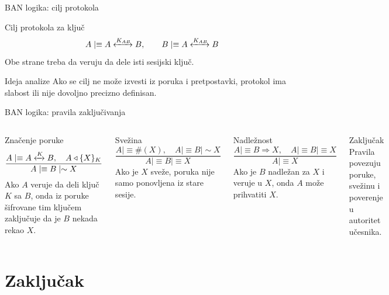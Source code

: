 \documentclass[aspectratio=1610]{beamer}
\newcommand{\enc}[2]{\{#1\}_{#2}}
\begin{document}
\begin{frame}[t]{BAN logika: cilj protokola}
\small
\begin{block}{Cilj protokola za ključ}
\[
A\mid\equiv A\xleftrightarrow{K_{AB}}B,
\qquad
B\mid\equiv A\xleftrightarrow{K_{AB}}B
\]
Obe strane treba da veruju da dele isti sesijski ključ.
\end{block}

\begin{alertblock}{Ideja analize}
Ako se cilj ne može izvesti iz poruka i pretpostavki, protokol ima slabost ili nije dovoljno precizno definisan.
\end{alertblock}
\end{frame}

\begin{frame}[t]{BAN logika: pravila zaključivanja}
\scriptsize
\begin{columns}[T,onlytextwidth]
\begin{block}{Značenje poruke}
\[
\frac{A\mid\equiv A\xleftrightarrow{K}B,\quad A\triangleleft \enc{X}{K}}
{A\mid\equiv B\mid\sim X}
\]
Ako $A$ veruje da deli ključ $K$ sa $B$, onda iz poruke šifrovane tim ključem zaključuje da je $B$ nekada rekao $X$.
\end{block}

\begin{block}{Svežina}
\[
\frac{A\mid\equiv \#(X),\quad A\mid\equiv B\mid\sim X}
{A\mid\equiv B\mid\equiv X}
\]
Ako je $X$ sveže, poruka nije samo ponovljena iz stare sesije.
\end{block}

\begin{block}{Nadležnost}
\[
\frac{A\mid\equiv B\Rightarrow X,\quad A\mid\equiv B\mid\equiv X}
{A\mid\equiv X}
\]
Ako je $B$ nadležan za $X$ i veruje u $X$, onda $A$ može prihvatiti $X$.
\end{block}

\begin{alertblock}{Zaključak}
Pravila povezuju poruke, svežinu i poverenje u autoritet učesnika.
\end{alertblock}
\end{columns}
\end{frame}

\section{Zaključak}
\end{document}
